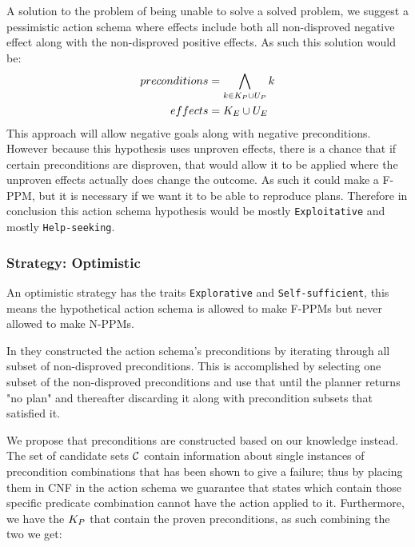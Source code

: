 \documentclass[\master/Master.tex]{subfiles}
\begin{document}
	A solution to the problem of being unable to solve a solved problem, we suggest a pessimistic action schema where effects include both all non-disproved negative effect along with the non-disproved positive effects.
	As such this solution would be:
		\begin{equation}
			\begin{split}			
				preconditions&= \bigwedge\limits_{k \in K_P \cup U_P} k \\
				effects&=  K_E \cup U_E
			\end{split}
		\end{equation}
	This approach will allow negative goals along with negative preconditions. 
	However because this hypothesis uses unproven effects, there is a chance that if certain preconditions are disproven, that would allow it to be applied where the unproven effects actually does change the outcome.
	As such it could make a F-PPM, but it is necessary if we want it to be able to reproduce plans. 
	Therefore in conclusion this action schema hypothesis would be mostly \texttt{Exploitative} and mostly \texttt{Help-seeking}.
	
	

\subsubsection{Strategy: Optimistic} 

	An optimistic strategy has the traits \texttt{Explorative} and \texttt{Self-sufficient},
	this means the hypothetical action schema is allowed to make F-PPMs but never allowed to make N-PPMs.

	In \cite{Walsh2008} they constructed the action schema's preconditions by iterating through all subset of non-disproved preconditions.
	This is accomplished by selecting one subset of the non-disproved preconditions and use that until the planner returns "no plan" and thereafter discarding it along with precondition subsets that satisfied it.

	We propose that preconditions are constructed based on our knowledge instead.
	The set of candidate sets $\mathcal{C}$ contain information about single instances of precondition combinations that has been shown to give a failure;
	thus by placing them in CNF in the action schema we guarantee that states which contain those specific predicate combination cannot have the action applied to it.
	Furthermore, we have the $K_P$ that contain the proven preconditions, as such combining the two we get:
\end{document}
